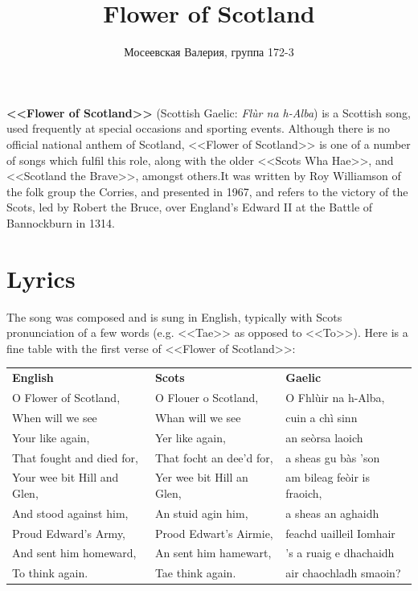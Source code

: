 \documentclass[a4paper,12pt]{article}
\author{Мосеевская Валерия, группа 172-3}
\title{\textbf{Flower of Scotland}}
\begin{document}

\maketitle

\textbf{<<Flower of Scotland>>} (Scottish Gaelic: \textit{Flùr na h-Alba}) is a Scottish song, used frequently at special occasions and sporting events. Although there is no official national anthem of Scotland, <<Flower of Scotland>> is one of a number of songs which fulfil this role, along with the older <<Scots Wha Hae>>, and <<Scotland the Brave>>, amongst others.It was written by Roy Williamson of the folk group the Corries, and presented in 1967, and refers to the victory of the Scots, led by Robert the Bruce, over England's Edward II at the Battle of Bannockburn in 1314.

\tableofcontents

\section{Lyrics}

The song was composed and is sung in English, typically with Scots pronunciation of a few words (e.g. <<Tae>> as opposed to <<To>>). Here is a fine table with the first verse of <<Flower of Scotland>>:

\begin{longtable}{p{5cm}p{5cm}p{5cm}}
    \\
	\textbf{English} & \textbf{Scots} & \textbf{Gaelic} \\
	O Flower of Scotland, & O Flouer o Scotland, & O Fhlùir na h-Alba,\\
	When will we see & Whan will we see & cuin a chì sinn \\
	Your like again, & Yer like again, & an seòrsa laoich \\
	That fought and died for, & That focht an dee'd for, & a sheas gu bàs 'son \\
	Your wee bit Hill and Glen, & Yer wee bit Hill an Glen, & am bileag feòir is fraoich,\\
	And stood against him, & An stuid agin him, & a sheas an aghaidh\\
	Proud Edward's Army, & Prood Edwart's Airmie, & feachd uailleil Iomhair\\
	And sent him homeward, & An sent him hamewart, & 's a ruaig e dhachaidh\\
	To think again. & Tae think again. & air chaochladh smaoin?\\
\end{longtable} 
\end{document}
